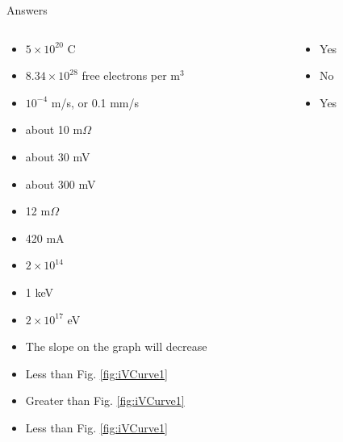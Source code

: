 \documentclass{beamer}
\begin{document}
\begin{frame}{Answers}
\tiny
\begin{columns}[T]
\begin{column}{0.5\textwidth}
\begin{itemize}
\item $5 \times 10^{20}$ C
\item $8.34 \times 10^{28}$ free electrons per m$^3$
\item $10^{-4}$ m/s, or 0.1 mm/s
\item about 10 m$\Omega$
\item about 30 mV
\item about 300 mV
\item 12 m$\Omega$
\item 420 mA
\item $2 \times 10^{14}$
\item 1 keV
\item $2 \times 10^{17}$ eV
\item The slope on the graph will decrease
\item Less than Fig. \ref{fig:iVCurve1}
\item Greater than Fig. \ref{fig:iVCurve1}
\item Less than Fig. \ref{fig:iVCurve1}
\end{itemize}
\end{column}
\begin{column}{0.5\textwidth}
\begin{itemize}
\item Yes
\item No
\item Yes
\end{itemize}
\end{column}
\end{columns}
\end{frame}
\end{document}
